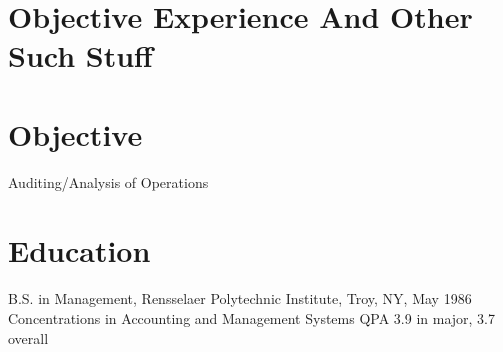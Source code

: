 \documentclass{nfriend-resume}
\begin{document}
 

\MakeHeader
        
\section{Objective Experience And Other Such Stuff}
\noindent
\blindtext

\section{Objective}
\noindent
Auditing/Analysis of Operations

\section{Education}
\noindent
B.S. in Management, Rensselaer Polytechnic Institute, Troy, NY, May 1986
Concentrations in Accounting and Management Systems
QPA 3.9 in major, 3.7 overall                     
\end{document}
